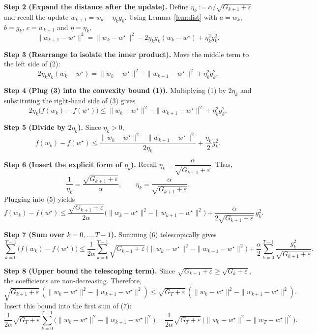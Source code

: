 \documentclass[11pt]{article}
\begin{document}
\noindent\textbf{Step 2 (Expand the distance after the update).}  
Define $\eta_k:=\alpha/\sqrt{G_{k+1}+\varepsilon}$ and recall the update
$w_{k+1}=w_k-\eta_k g_k$.  
Using Lemma~\ref{lem:dist} with $a=w_k$, $b=g_k$, $c=w_{k+1}$ and $\eta=\eta_k$,
\begin{equation}
\|w_{k+1}-w^\star\|^{2}
= \|w_k-w^\star\|^{2}
-2\eta_k g_k (w_k-w^\star)
+\eta_k^{2} g_k^{2}. \tag{2}
\end{equation}

\noindent\textbf{Step 3 (Rearrange to isolate the inner product).}  
Move the middle term to the left side of (2):
\[
2\eta_k g_k (w_k-w^\star)
= \|w_k-w^\star\|^{2}
-\|w_{k+1}-w^\star\|^{2}
+\eta_k^{2} g_k^{2}. \tag{3}
\]

\noindent\textbf{Step 4 (Plug (3) into the convexity bound (1)).}  
Multiplying (1) by $2\eta_k$ and substituting the right‑hand side of (3) gives
\[
2\eta_k\bigl(f(w_k)-f(w^\star)\bigr)
\le
\|w_k-w^\star\|^{2}
-\|w_{k+1}-w^\star\|^{2}
+\eta_k^{2} g_k^{2}. \tag{4}
\]

\noindent\textbf{Step 5 (Divide by $2\eta_k$).}  
Since $\eta_k>0$,
\[
f(w_k)-f(w^\star)
\le
\frac{\|w_k-w^\star\|^{2}-\|w_{k+1}-w^\star\|^{2}}{2\eta_k}
+\frac{\eta_k}{2} g_k^{2}. \tag{5}
\]

\noindent\textbf{Step 6 (Insert the explicit form of $\eta_k$).}  
Recall $\eta_k = \dfrac{\alpha}{\sqrt{G_{k+1}+\varepsilon}}$.
Thus,
\[
\frac{1}{\eta_k}= \frac{\sqrt{G_{k+1}+\varepsilon}}{\alpha},\qquad
\eta_k = \frac{\alpha}{\sqrt{G_{k+1}+\varepsilon}}.
\]
Plugging into (5) yields
\[
f(w_k)-f(w^\star)
\le
\frac{\sqrt{G_{k+1}+\varepsilon}}{2\alpha}\bigl(\|w_k-w^\star\|^{2}-\|w_{k+1}-w^\star\|^{2}\bigr)
+\frac{\alpha}{2\sqrt{G_{k+1}+\varepsilon}}\, g_k^{2}. \tag{6}
\]

\noindent\textbf{Step 7 (Sum over $k=0,\dots,T-1$).}  
Summing (6) telescopically gives
\[
\sum_{k=0}^{T-1}\bigl(f(w_k)-f(w^\star)\bigr)
\le
\frac{1}{2\alpha}\sum_{k=0}^{T-1}\sqrt{G_{k+1}+\varepsilon}\,\bigl(\|w_k-w^\star\|^{2}-\|w_{k+1}-w^\star\|^{2}\bigr)
+\frac{\alpha}{2}\sum_{k=0}^{T-1}\frac{g_k^{2}}{\sqrt{G_{k+1}+\varepsilon}}. \tag{7}
\]

\noindent\textbf{Step 8 (Upper bound the telescoping term).}  
Since $\sqrt{G_{k+1}+\varepsilon}\ge\sqrt{G_{k}+\varepsilon}$, the coefficients are non‑decreasing.  
Therefore,
\[
\sqrt{G_{k+1}+\varepsilon}\,(\|w_k-w^\star\|^{2}-\|w_{k+1}-w^\star\|^{2})
\le
\sqrt{G_{T}+\varepsilon}\,(\|w_k-w^\star\|^{2}-\|w_{k+1}-w^\star\|^{2}).
\]
Insert this bound into the first sum of (7):
\[
\frac{1}{2\alpha}\sqrt{G_{T}+\varepsilon}\sum_{k=0}^{T-1}\bigl(\|w_k-w^\star\|^{2}-\|w_{k+1}-w^\star\|^{2}\bigr)
=
\frac{1}{2\alpha}\sqrt{G_{T}+\varepsilon}\,\bigl(\|w_0-w^\star\|^{2}-\|w_T-w^\star\|^{2}\bigr). \tag{8}
\]
\end{document}

